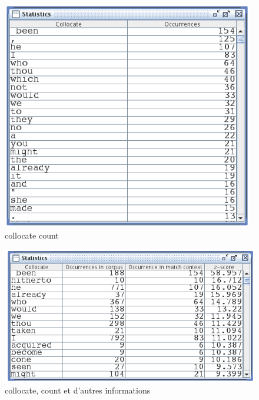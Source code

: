\begin{figure}[!ht]
\begin{center}
\includegraphics[width=11cm]{resources/img/fig4-11.png}
\caption{collocate count\label{fig-statistics-mode1}}
\end{center}
\end{figure}

\begin{figure}[!ht]
\begin{center}
\includegraphics[width=12cm]{resources/img/fig4-12.png}
\caption{collocate, count et d'autres informations\label{fig-statistics-mode2}}
\end{center}
\end{figure}
